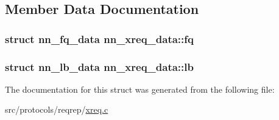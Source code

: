 \subsection{Member Data Documentation}
\subsubsection[{fq}]{\setlength{\rightskip}{0pt plus 5cm}struct {\bf nn\+\_\+fq\+\_\+data} nn\+\_\+xreq\+\_\+data\+::fq}\hypertarget{structnn__xreq__data_a88b05a788b59690e65795136e63f4c9c}{}\label{structnn__xreq__data_a88b05a788b59690e65795136e63f4c9c}
\subsubsection[{lb}]{\setlength{\rightskip}{0pt plus 5cm}struct {\bf nn\+\_\+lb\+\_\+data} nn\+\_\+xreq\+\_\+data\+::lb}\hypertarget{structnn__xreq__data_a2290d7fe793cdb2bd32c5d19092b361f}{}\label{structnn__xreq__data_a2290d7fe793cdb2bd32c5d19092b361f}


The documentation for this struct was generated from the following file\+:\begin{DoxyCompactItemize}
\item 
src/protocols/reqrep/\hyperlink{xreq_8c}{xreq.\+c}\end{DoxyCompactItemize}
